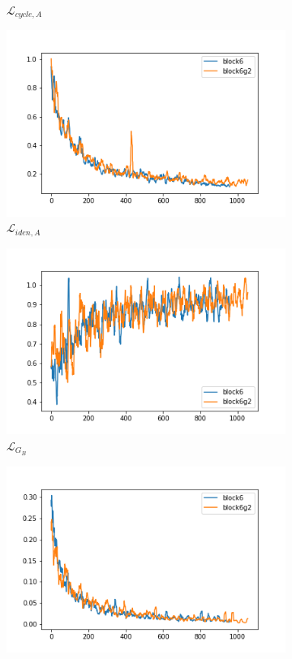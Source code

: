 \documentclass[twocolumn,11pt]{ctexart}
\begin{document}
\begin{figure}[htb]
\begin{subfigure}[b]{0.23\linewidth}
        \caption{$\mathcal{L}_{cycle,A}$}
      \end{subfigure}
      \begin{subfigure}[b]{0.23\linewidth}
        \includegraphics[width=\linewidth]{exp6_idt_A.png}
        \caption{$\mathcal{L}_{iden,A}$}
      \end{subfigure}
      \begin{subfigure}[b]{0.23\linewidth}
        \includegraphics[width=\linewidth]{exp6_G_B.png}
        \caption{$\mathcal{L}_{G_B}$}
      \end{subfigure}
      \begin{subfigure}[b]{0.23\linewidth}
        \includegraphics[width=\linewidth]{exp6_D_B.png}

\end{subfigure}
\end{figure}
\end{document}
